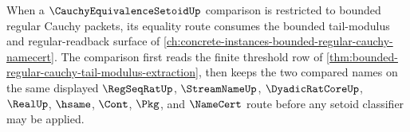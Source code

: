 When a $\CauchyEquivalenceSetoidUp$ comparison is restricted to bounded regular Cauchy packets, its equality route consumes the bounded tail-modulus and regular-readback surface of \autoref{ch:concrete-instances-bounded-regular-cauchy-namecert}. The comparison first reads the finite threshold row of \autoref{thm:bounded-regular-cauchy-tail-modulus-extraction}, then keeps the two compared names on the same displayed $\RegSeqRatUp$, $\StreamNameUp$, $\DyadicRatCoreUp$, $\RealUp$, $\hsame$, $\Cont$, $\Pkg$, and $\NameCert$ route before any setoid classifier may be applied.

